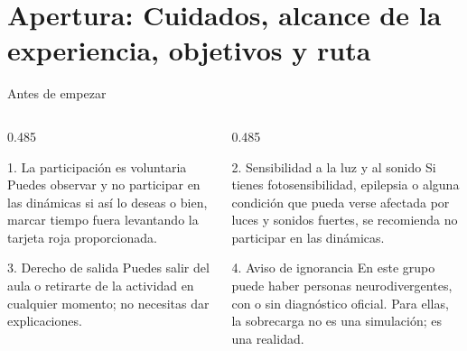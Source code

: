 

\section{Apertura: Cuidados, alcance de la experiencia, objetivos y ruta}
\begin{frame}[shrink=6]{Antes de empezar}

  \vspace{-0.05cm}
  \begin{columns}[T,totalwidth=\textwidth]
    \begin{column}{0.485\textwidth}
      \begin{block}{1. La participación es voluntaria}
        \footnotesize Puedes observar y no participar en las dinámicas si así lo deseas
        o bien, marcar tiempo fuera levantando la tarjeta roja proporcionada.
      \end{block}
      \begin{block}{3. Derecho de salida}
        \footnotesize Puedes salir del aula o retirarte de la actividad en cualquier
        momento; no necesitas dar explicaciones.
      \end{block}
    \end{column}
    \begin{column}{0.485\textwidth}
      \begin{block}{2. Sensibilidad a la luz y al sonido}
        \footnotesize Si tienes fotosensibilidad, epilepsia o alguna condición que pueda
        verse afectada por luces y sonidos fuertes, se recomienda no participar
        en las dinámicas.
      \end{block}
      \begin{block}{4. Aviso de ignorancia}
        \footnotesize En este grupo puede haber personas neurodivergentes, con o sin
        diagnóstico oficial. Para ellas, la sobrecarga no es una simulación; es
        una realidad.
      \end{block}
    \end{column}
  \end{columns}
\end{frame}

